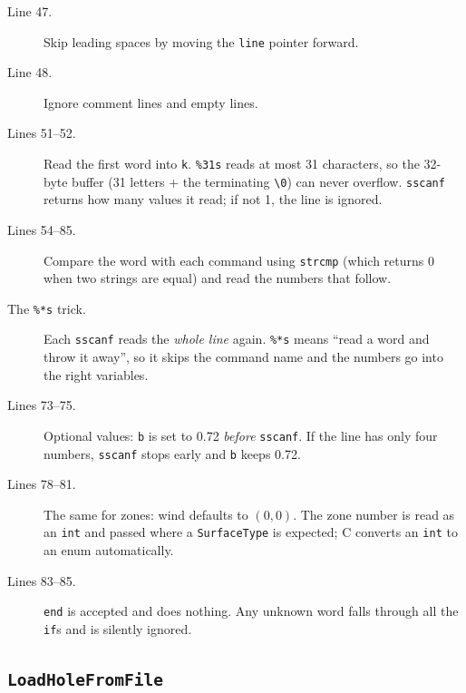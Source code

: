 \documentclass[11pt,a4paper]{article}
\newcommand{\code}[3]{}
\begin{document}
\begin{description}
  \item[Line 47.] Skip leading spaces by moving the \texttt{line} pointer forward.
  \item[Line 48.] Ignore comment lines and empty lines.
  \item[Lines 51--52.] Read the first word into \texttt{k}. \texttt{\%31s} reads at most 31 characters, so the
  32-byte buffer (31 letters + the terminating \texttt{\textbackslash 0}) can never overflow. \texttt{sscanf}
  returns how many values it read; if not 1, the line is ignored.
  \item[Lines 54--85.] Compare the word with each command using \texttt{strcmp} (which returns 0 when two strings
  are equal) and read the numbers that follow.
  \item[The \texttt{\%*s} trick.] Each \texttt{sscanf} reads the \emph{whole line} again. \texttt{\%*s} means ``read
  a word and throw it away'', so it skips the command name and the numbers go into the right variables.
  \item[Lines 73--75.] Optional values: \texttt{b} is set to 0.72 \emph{before} \texttt{sscanf}. If the line has only
  four numbers, \texttt{sscanf} stops early and \texttt{b} keeps 0.72.
  \item[Lines 78--81.] The same for zones: wind defaults to $(0,0)$. The zone number is read as an \texttt{int} and
  passed where a \texttt{SurfaceType} is expected; C converts an \texttt{int} to an enum automatically.
  \item[Lines 83--85.] \texttt{end} is accepted and does nothing. Any unknown word falls through all the
  \texttt{if}s and is silently ignored.
\end{description}

\subsection{\texttt{LoadHoleFromFile}}

\code{level.c}{88}{113}
\end{document}
